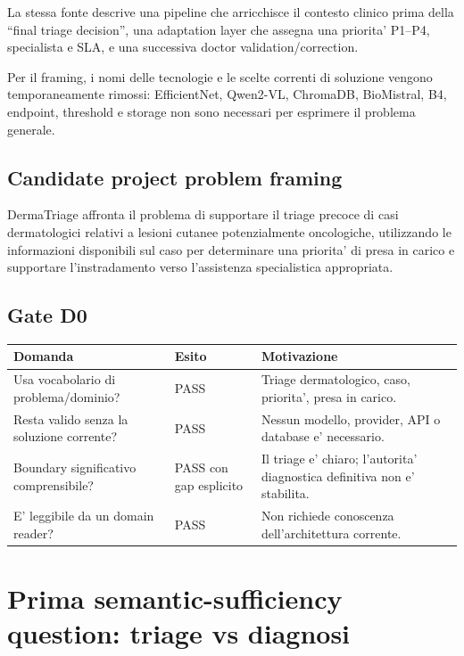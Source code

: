 \documentclass[11pt,a4paper]{article}
\begin{document}
La stessa fonte descrive una pipeline che arricchisce il contesto clinico prima della ``final triage decision'', una adaptation layer che assegna una priorita' P1--P4, specialista e SLA, e una successiva doctor validation/correction.

Per il framing, i nomi delle tecnologie e le scelte correnti di soluzione vengono temporaneamente rimossi: EfficientNet, Qwen2-VL, ChromaDB, BioMistral, B4, endpoint, threshold e storage non sono necessari per esprimere il problema generale.

\subsection{Candidate project problem framing}

\begin{ddtacore}[title={Candidate framing accettato nella sessione}]
DermaTriage affronta il problema di supportare il triage precoce di casi dermatologici relativi a lesioni cutanee potenzialmente oncologiche, utilizzando le informazioni disponibili sul caso per determinare una priorita' di presa in carico e supportare l'instradamento verso l'assistenza specialistica appropriata.
\end{ddtacore}

\subsection{Gate D0}

\begin{tabularx}{\textwidth}{L{54mm}L{23mm}Y}
\toprule
\textbf{Domanda} & \textbf{Esito} & \textbf{Motivazione} \\
\midrule
Usa vocabolario di problema/dominio? & PASS & Triage dermatologico, caso, priorita', presa in carico. \\
Resta valido senza la soluzione corrente? & PASS & Nessun modello, provider, API o database e' necessario. \\
Boundary significativo comprensibile? & PASS con gap esplicito & Il triage e' chiaro; l'autorita' diagnostica definitiva non e' stabilita. \\
E' leggibile da un domain reader? & PASS & Non richiede conoscenza dell'architettura corrente. \\
\bottomrule
\end{tabularx}

\section{Prima semantic-sufficiency question: triage vs diagnosi}
\end{document}

